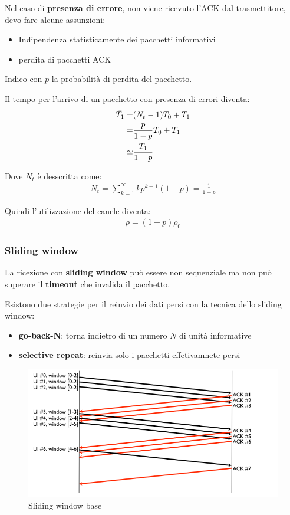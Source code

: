 Nel caso di \textbf{presenza di errore}, non viene ricevuto l'ACK dal trasmettitore, devo fare alcune assunzioni:
\begin{itemize}
	\item Indipendenza statisticamente dei pacchetti informativi
	\item perdita di pacchetti ACK
\end{itemize}

Indico con $p$ la probabilità di perdita del pacchetto.


Il tempo per l'arrivo di un pacchetto con presenza di errori diventa:
\begin{align}
	\Bar{T_1} = & (N_t - 1) T_0 + T_1     \\
	=           & \frac{p}{1-p} T_0 + T_1 \\
	\simeq      & \frac{T_1}{1-p}
\end{align}

Dove $N_t$ è desscritta come:
\begin{align}
	N_t = \sum_{k=1}^{\infty} k p^{k-1} (1-p) = \frac{1}{1-p}
\end{align}

Quindi l'utilizzazione del canele diventa:
\begin{align}
	\rho = (1 - p) \rho_0
\end{align}


\subsubsection{Sliding window}
La ricezione con \textbf{sliding window} può essere non sequenziale ma non può superare il \textbf{timeout} che invalida il pacchetto.

Esistono due strategie per il reinvio dei dati persi con la tecnica dello sliding window:
\begin{itemize}
  \item \textbf{go-back-N}: torna indietro di un numero $N$ di unità informative
  \item \textbf{selective repeat}: reinvia solo i pacchetti effetivamnete persi
\end{itemize}

\begin{figure}[!ht]
	\centering
	\includegraphics[width=0.4\columnwidth]{./images/sliding_window_base.png}
  \caption{Sliding window base}
  \label{fig:sliding_window_base}
\end{figure}


